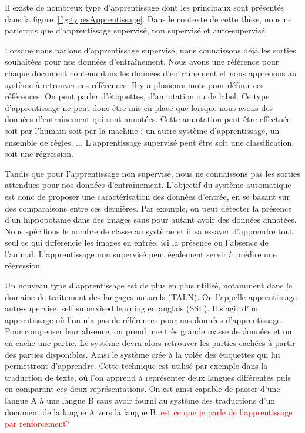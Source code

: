 
Il existe de nombreux type d'apprentissage dont les principaux sont présentés dans la figure~\ref{fig:typesApprentissage}. Dans le contexte de cette thèse, nous ne parlerons que d'apprentissage supervisé, non supervisé et auto-supervisé.

Lorsque nous parlons d'apprentissage supervisé, nous connaissons déjà les sorties souhaitées pour nos données d’entraînement. Nous avons une référence pour chaque document contenu dans les données d’entraînement et nous apprenons au système à retrouver ces références.
Il y a plusieurs mots pour définir ces références. On peut parler d'étiquettes, d'annotation ou de label. Ce type d'apprentissage ne peut donc être mis en place que lorsque nous avons des données d’entraînement qui sont annotées. Cette annotation peut être effectuée soit par l'humain soit par la machine : un autre système d'apprentissage, un ensemble de règles, ... L'apprentissage supervisé peut être soit une classification, soit une régression.

Tandis que pour l'apprentissage non supervisé, nous ne connaissons pas les sorties attendues pour nos données d’entraînement. L'objectif du système automatique est donc de proposer une caractérisation des données d'entrée, en se basant sur des comparaisons entre ces dernières. Par exemple, on peut détecter la présence d'un hippopotame dans des images sans pour autant avoir des données annotées. Nous spécifions le nombre de classe au système et il va essayer d'apprendre tout seul ce qui différencie les images en entrée, ici la présence ou l'absence de l'animal. L'apprentissage non supervisé peut également servir à prédire une régression.

Un nouveau type d'apprentissage est de plus en plus utilisé, notamment dans le domaine de traitement des langages naturels (TALN). On l'appelle apprentissage auto-supervisé, self supervised learning en anglais (SSL). Il s'agit d'un apprentissage où l'on n'a pas de références pour nos données d'apprentissage. Pour compenser leur absence, on prend une très grande masse de données et on en cache une partie. Le système devra alors retrouver les parties cachées à partir des parties disponibles. Ainsi le système crée à la volée des étiquettes qui lui permettront d'apprendre.
Cette technique est utilisé par exemple dans la traduction de texte, où l'on apprend à représenter deux langues différentes puis en comparant ces deux représentations. On est ainsi capable de passer d'une langue A à une langue B sans avoir fourni au système des traductions d'un document de la langue A vers la langue B.
\textcolor{red}{est ce que je parle de l'apprentissage par renforcement?}

